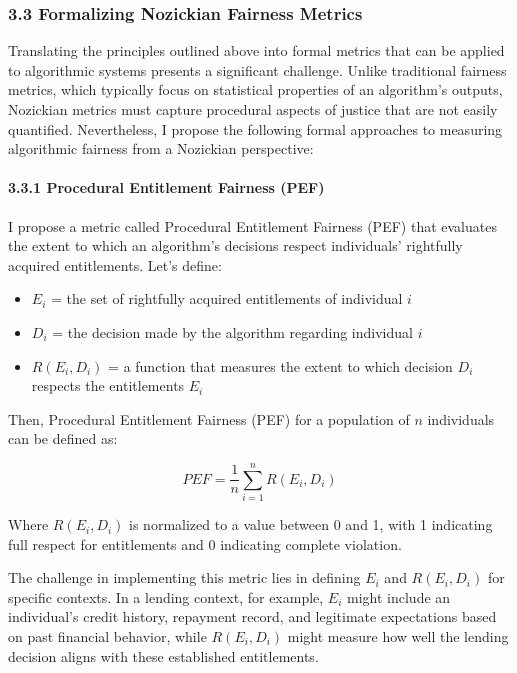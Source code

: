 \subsubsection{3.3 Formalizing Nozickian Fairness
Metrics}\label{formalizing-nozickian-fairness-metrics}

Translating the principles outlined above into formal metrics that can
be applied to algorithmic systems presents a significant challenge.
Unlike traditional fairness metrics, which typically focus on
statistical properties of an algorithm's outputs, Nozickian metrics must
capture procedural aspects of justice that are not easily quantified.
Nevertheless, I propose the following formal approaches to measuring
algorithmic fairness from a Nozickian perspective:

\paragraph{3.3.1 Procedural Entitlement Fairness
(PEF)}\label{procedural-entitlement-fairness-pef}

I propose a metric called Procedural Entitlement Fairness (PEF) that
evaluates the extent to which an algorithm's decisions respect
individuals' rightfully acquired entitlements. Let's define:

\begin{itemize}
\tightlist
\item
  \(E_i\) = the set of rightfully acquired entitlements of individual
  \(i\)
\item
  \(D_i\) = the decision made by the algorithm regarding individual
  \(i\)
\item
  \(R(E_i, D_i)\) = a function that measures the extent to which
  decision \(D_i\) respects the entitlements \(E_i\)
\end{itemize}

Then, Procedural Entitlement Fairness (PEF) for a population of \(n\)
individuals can be defined as:

\[PEF = \frac{1}{n} \sum_{i=1}^{n} R(E_i, D_i)\]

Where \(R(E_i, D_i)\) is normalized to a value between 0 and 1, with 1
indicating full respect for entitlements and 0 indicating complete
violation.

The challenge in implementing this metric lies in defining \(E_i\) and
\(R(E_i, D_i)\) for specific contexts. In a lending context, for
example, \(E_i\) might include an individual's credit history, repayment
record, and legitimate expectations based on past financial behavior,
while \(R(E_i, D_i)\) might measure how well the lending decision aligns
with these established entitlements.

